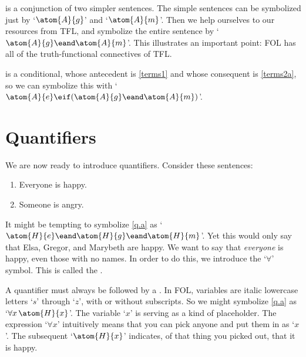  is a conjunction of two simpler sentences. The simple sentences can be symbolized just by `$\atom{A}{g}$' and `$\atom{A}{m}$'. Then we help ourselves to our resources from TFL, and symbolize the entire sentence by `$\atom{A}{g} \eand \atom{A}{m}$'. This illustrates an important point: FOL has all of the truth-functional connectives of TFL.

 is a conditional, whose antecedent is \cref*{terms1} and whose consequent is \cref*{terms2a}, so we can symbolize this with `$\atom{A}{e} \eif (\atom{A}{g} \eand \atom{A}{m})$'.

\section{Quantifiers}
We are now ready to introduce quantifiers. Consider these sentences:
	\begin{enumerate}
		\item\label{q.a} Everyone is happy.
		\item\label{q.e} Someone is angry.
	\end{enumerate}
It might be tempting to symbolize \cref*{q.a} as `$\atom{H}{e} \eand \atom{H}{g} \eand \atom{H}{m}$'. Yet this would only say that Elsa, Gregor, and Marybeth are happy. We want to say that \emph{everyone} is happy, even those with no names. In order to do this, we introduce the `$\forall$' symbol. This is called the .


A quantifier must always be followed by a . In FOL, variables are italic lowercase letters `$s$' through `$z$', with or without subscripts. So we might symbolize \cref*{q.a} as `$\forall x\, \atom{H}{x}$'.  The variable `$x$' is serving as a kind of placeholder. The expression `$\forall x$' intuitively means that you can pick anyone and put them in as `$x$'. The subsequent `$\atom{H}{x}$' indicates, of that thing you picked out, that it is happy.



